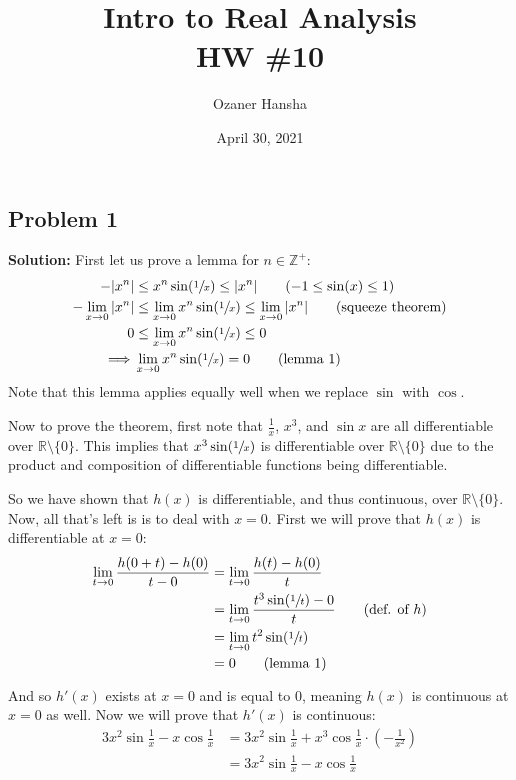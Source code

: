 \documentclass{article}
\newcommand{\R}{\mathbb R}
\newcommand{\Z}{\mathbb Z}
\begin{document}
\title{Intro to Real Analysis\\HW \#10}
\author{Ozaner Hansha}
\date{April 30, 2021}
\maketitle

\subsection*{Problem 1}
\noindent\textbf{Solution:} First let us prove a lemma for $n\in\Z^+$:
\begin{align*}
  -|x^n|&\le x^n\sin(\sfrac{1}{x})\le |x^n|\tag{$-1\le\sin(x)\le1$}\\
  -\lim_{x\to0}|x^n|&\le\lim_{x\to0}x^n\sin(\sfrac{1}{x})\le\lim_{x\to0}|x^n|\tag{squeeze theorem}\\
  0&\le\lim_{x\to0}x^n\sin(\sfrac{1}{x})\le0\\
  \implies&\lim_{x\to0}x^n\sin(\sfrac{1}{x})=0\tag{lemma 1}
\end{align*}
Note that this lemma applies equally well when we replace $\sin$ with $\cos$.
\bigskip

Now to prove the theorem, first note that $\frac{1}{x}$, $x^3$, and $\sin x$ are all differentiable over $\R\setminus\{0\}$. This implies that $x^3\sin(\sfrac{1}{x})$ is differentiable over $\R\setminus\{0\}$ due to the product and composition of differentiable functions being differentiable.

So we have shown that $h(x)$ is differentiable, and thus continuous, over $\R\setminus\{0\}$. Now, all that's left is is to deal with $x=0$. First we will prove that $h(x)$ is differentiable at $x=0$:
\begin{align*}
  \lim_{t\to0}\frac{h(0+t)-h(0)}{t-0}&=\lim_{t\to0}\frac{h(t)-h(0)}{t}\\
  &=\lim_{t\to0}\frac{t^3\sin(\sfrac{1}{t})-0}{t}\tag{def. of $h$}\\
  &=\lim_{t\to0}t^2\sin(\sfrac{1}{t})\\
  &=0\tag{lemma 1}
\end{align*}

And so $h'(x)$ exists at $x=0$ and is equal to 0, meaning $h(x)$ is continuous at $x=0$ as well. Now we will prove that $h'(x)$ is continuous:
\begin{align*}
  3x^2\sin\frac{1}{x}-x\cos\frac{1}{x}&=3x^2\sin\frac{1}{x}+x^3\cos\frac{1}{x}\cdot\left(-\frac{1}{x^2}\right)\tag{chain-rule}\\
  &=3x^2\sin\frac{1}{x}-x\cos\frac{1}{x}
\end{align*}
\end{document}
